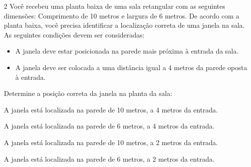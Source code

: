 
\num{2} Você recebeu uma planta baixa de uma sala retangular com as seguintes
dimensões: Comprimento de 10 metros e largura de 6 metros. De acordo com a planta baixa, você precisa identificar a localização correta de uma janela na sala. As seguintes condições devem ser
consideradas:

\begin{itemize}
\item A janela deve estar posicionada na parede mais próxima à entrada da
sala. 
\item A janela deve ser colocada a uma distância igual a 4 metros da
parede oposta à entrada.
\end{itemize}

Determine a posição correta da janela na planta da sala:

\begin{escolha}
\item A janela está localizada na parede de 10 metros, a 4 metros da
entrada.
\item A janela está localizada na parede de 6 metros, a 4 metros da
entrada.
\item A janela está localizada na parede de 10 metros, a 2 metros da
entrada.
\item A janela está localizada na parede de 6 metros, a 2 metros da
entrada.
\end{escolha}


